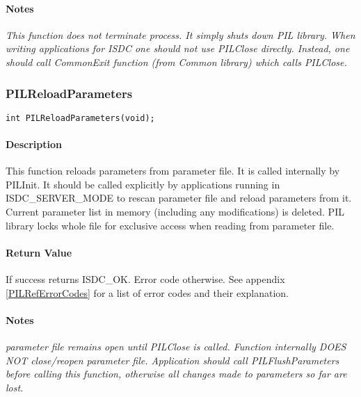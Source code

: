 \paragraph{Notes\\}
{\it
This function does not terminate process. It simply shuts down PIL library.
When writing applications for ISDC one should not use PILClose directly. 
Instead, one should call CommonExit function (from Common library) 
which calls PILClose.
}



\subsubsection{PILReloadParameters}

\begin{verbatim}
int PILReloadParameters(void);
\end{verbatim}

\paragraph{Description\\}
This function reloads parameters from parameter file. It is called
internally by PILInit. It
should be called explicitly by applications running in ISDC\_SERVER\_MODE to
rescan
parameter file and reload parameters from it. Current parameter list in
memory (including
any modifications) is deleted. PIL library locks whole file for exclusive
access when reading
from parameter file. 

\paragraph{Return Value\\}
If success returns ISDC\_OK. Error code otherwise. See appendix \ref{PILRefErrorCodes}
for a list of error codes and their explanation.

\paragraph{Notes\\}
{\it
parameter file remains open until PILClose is called. Function internally
DOES NOT close/reopen parameter file. Application should call
PILFlushParameters before calling this function, otherwise all changes
made to parameters so far are lost.
}



